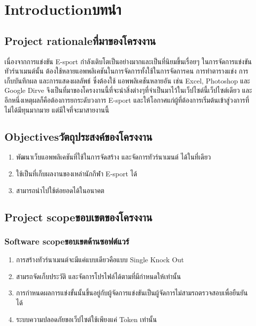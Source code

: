 \chapter{\ifenglish Introduction\else บทนำ\fi}

\section{\ifenglish Project rationale\else ที่มาของโครงงาน\fi}
เนื่องจากการแข่งขัน E-sport กำลังเติบโตเป็นอย่างมากและเป็นที่นิยมขึ้นเรื่อยๆ ในการจัดการแข่งขันทัวร์นาเมนต์นั้น
ต้องใช้หลายแอพพลิเคชันในการจัดการทั้งใช้ในการจัดการคน การทำตารางแข่ง การเก็บบันทึกผล และการแสดงผลลัพธ์ ซึ่งต้องใช้
แอพพลิเคชันหลายอัน เช่น Excel, Photoshop และ Google Dirve   จึงเป็นที่มาของโครงงานนี้ที่จะนำสิ่งต่างๆที่จำเป็นมาไว้ในเว็ปไซต์นี้เว็ปไซต์เดียว
และ อีกหนึ่งเหตุผลก็คือต้องการยกระดับวงการ E-sport และให้โอกาศแก่ผู้ที่ต้องการเริ่มต้นเข้าสู่วงการที่ไม่ได้มีทุนมากมาย แต่มีใจที่จะมาสายงานนี้  


\section{\ifenglish Objectives\else วัตถุประสงค์ของโครงงาน\fi}
\begin{enumerate}
    \item พัฒนาเว็บแอพพลิเคชันที่ใช้ในการจัดสร้าง และจัดการทัวร์นาเมนต์ ได้ในที่เดียว
    \item ใช้เป็นที่เก็บผลงานของเหล่านักกีฬา E-sport ได้
    \item สามารถนำไปใช้ต่อยอดได้ในอนาคต
\end{enumerate}

\section{\ifenglish Project scope\else ขอบเขตของโครงงาน\fi}

\subsection{\ifenglish Software scope\else ขอบเขตด้านซอฟต์แวร์\fi}
\begin{enumerate}
    \item การสร้างทัวร์นาเมนต์จะมีแค่แบบเดียวคือแบบ Single Knock Out 
    \item สามรถจัดเก็บประวัติ และจัดการโปรไฟล์ได้ตามที่มีกำหนดให้เท่านั้น
    \item การกำหนดผลการแข่งขั้นนั้นขึ้นอยู่กับผู้จัดการแข่งขันเป็นผู้จัดการไม่สามรถตรวจสอบเพื่อยืนยันได้
    \item ระบบความปลอดภัยขอเว็ปไซต์ใช้เพียงแค่ Token เท่านั้น
\end{enumerate}

